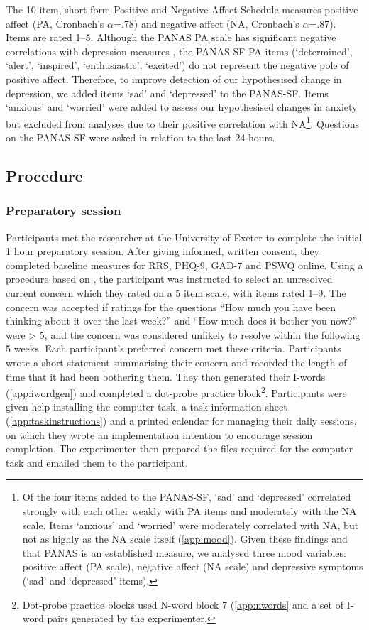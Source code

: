 \documentclass[man,floatsintext,a4paper,biblatex]{apa6}\usepackage[]{graphicx}\usepackage[]{color}
\begin{document}
The 10 item, short form Positive and Negative Affect Schedule
\parencite[PANAS-SF,][]{mackinnon_short_1999} measures positive affect
(PA, Cronbach's $\alpha$=.78) and negative affect (NA, Cronbach's
$\alpha$=.87). Items are rated 1--5. Although the PANAS PA
scale has significant negative correlations with depression measures
\parencite{watson_development_1988}, the PANAS-SF PA items (`determined',
`alert', `inspired', `enthusiastic', `excited') do not represent the
negative pole of positive affect. Therefore, to improve detection of our
hypothesised change in depression, we added items `sad' and `depressed'
to the PANAS-SF. Items `anxious' and `worried' were added to assess
our hypothesised changes in anxiety but excluded from analyses due to
their positive correlation with NA\footnote{Of the four items added to
the PANAS-SF, `sad' and `depressed' correlated strongly with each other
weakly with PA items and moderately with the NA scale. Items `anxious'
and `worried' were moderately correlated with NA, but not as highly
as the NA scale itself (\cref{app:mood}). Given these findings and
that PANAS is an established measure, we analysed three mood variables:
positive affect (PA scale), negative affect (NA scale) and depressive
symptoms (`sad' and `depressed' items).}. Questions on the PANAS-SF were
asked in relation to the last 24 hours.

\subsection{Procedure}

\subsubsection{Preparatory session}

Participants met the researcher at the University of Exeter to complete
the initial 1 hour preparatory session. After giving informed, written
consent, they completed baseline measures for RRS, PHQ-9, GAD-7 and
PSWQ online.  Using a procedure based on \textcite{roberts_cueing_2013},
the participant was instructed to select an unresolved current concern
which they rated on a 5 item scale, with items rated 1--9. The concern
was accepted if ratings for the questions \enquote{How much you have
been thinking about it over the last week?} and \enquote{How much does
it bother you now?} were > 5, and the concern was considered unlikely to
resolve within the following 5 weeks. Each participant's preferred concern
met these criteria. Participants wrote a short statement summarising
their concern and recorded the length of time that it had been bothering
them. They then generated their I-words (\cref{app:iwordgen}) and
completed a dot-probe practice block\footnote{Dot-probe practice blocks
used N-word block 7 (\cref{app:nwords} and a set of I-word pairs generated
by the experimenter.}. Participants were given help installing the
computer task, a task information sheet (\cref{app:taskinstructions}) and
a printed calendar for managing their daily sessions, on which they wrote
an implementation intention \parencite{gollwitzer_implementation_1999}
to encourage session completion. The experimenter then prepared the
files required for the computer task and emailed them to the participant.
\end{document}
